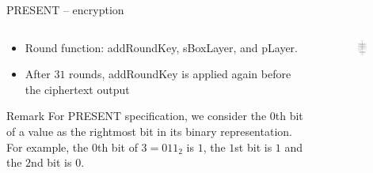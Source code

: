 \begin{frame}{PRESENT -- encryption}
\begin{columns}[T] %
\begin{column}{.55\textwidth}
\begin{itemize}
    \item Round function: addRoundKey, sBoxLayer, and pLayer.
    \item After $31$ rounds, addRoundKey is applied again before the ciphertext output 
\end{itemize}
\begin{alertblock}{Remark}
    For PRESENT specification, we consider the $0$th bit of a value as the rightmost bit in its binary representation.
For example, the $0$th bit of $3=011_2$ is $1$, the $1$st bit is $1$ and the $2$nd bit is $0$.
\end{alertblock}
\end{column}%
\hfill%
\begin{column}{.5\textwidth}
\begin{figure}
    \includegraphics[width=0.55\textwidth]{fig/PRESENT.pdf}
\end{figure}
\end{column}%
\end{columns}
\end{frame}

